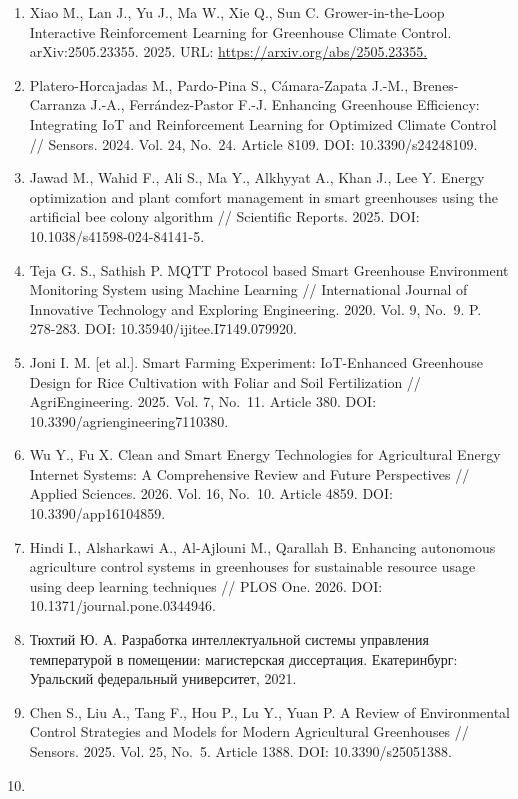 \documentclass[a4paper,14pt]{extarticle}
\begin{document}
\begin{enumerate}
  \url{https://arxiv.org/abs/2303.06110.}
\item
  Xiao M., Lan J., Yu J., Ma W., Xie Q., Sun C. Grower-in-the-Loop
  Interactive Reinforcement Learning for Greenhouse Climate Control.
  arXiv:2505.23355. 2025. URL: \url{https://arxiv.org/abs/2505.23355.}
\item
  Platero-Horcajadas M., Pardo-Pina S., Cámara-Zapata J.-M.,
  Brenes-Carranza J.-A., Ferrández-Pastor F.-J. Enhancing Greenhouse
  Efficiency: Integrating IoT and Reinforcement Learning for Optimized
  Climate Control // Sensors. 2024. Vol. 24, No.~24. Article 8109. DOI:
  10.3390/s24248109.
\item
  Jawad M., Wahid F., Ali S., Ma Y., Alkhyyat A., Khan J., Lee Y. Energy
  optimization and plant comfort management in smart greenhouses using
  the artificial bee colony algorithm // Scientific Reports. 2025. DOI:
  10.1038/s41598-024-84141-5.
\item
  Teja G. S., Sathish P. MQTT Protocol based Smart Greenhouse
  Environment Monitoring System using Machine Learning // International
  Journal of Innovative Technology and Exploring Engineering. 2020. Vol.
  9, No.~9. P. 278-283. DOI: 10.35940/ijitee.I7149.079920.
\item
  Joni I. M. {[}et al.{]}. Smart Farming Experiment: IoT-Enhanced
  Greenhouse Design for Rice Cultivation with Foliar and Soil
  Fertilization // AgriEngineering. 2025. Vol. 7, No.~11. Article 380.
  DOI: 10.3390/agriengineering7110380.
\item
  Wu Y., Fu X. Clean and Smart Energy Technologies for Agricultural
  Energy Internet Systems: A Comprehensive Review and Future
  Perspectives // Applied Sciences. 2026. Vol. 16, No.~10. Article 4859.
  DOI: 10.3390/app16104859.
\item
  Hindi I., Alsharkawi A., Al-Ajlouni M., Qarallah B. Enhancing
  autonomous agriculture control systems in greenhouses for sustainable
  resource usage using deep learning techniques // PLOS One. 2026. DOI:
  10.1371/journal.pone.0344946.
\item
  Тюхтий Ю. А. Разработка интеллектуальной системы управления
  температурой в помещении: магистерская диссертация. Екатеринбург:
  Уральский федеральный университет, 2021.
\item
  Chen S., Liu A., Tang F., Hou P., Lu Y., Yuan P. A Review of
  Environmental Control Strategies and Models for Modern Agricultural
  Greenhouses // Sensors. 2025. Vol. 25, No.~5. Article 1388. DOI:
  10.3390/s25051388.
\item

\end{enumerate}
\end{document}
